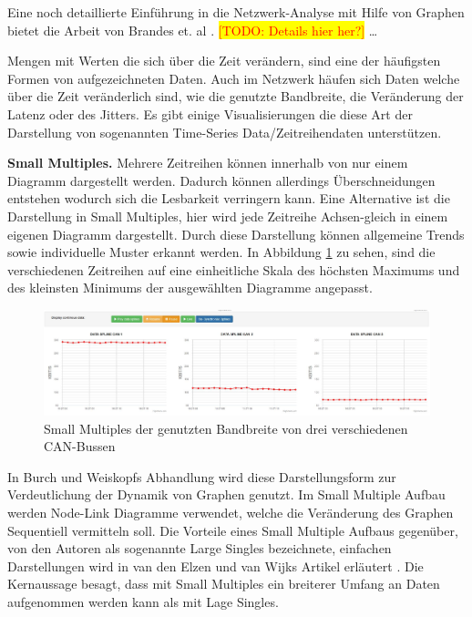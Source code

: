 \documentclass[draft=false
              ,paper=a4
              ,twoside=false
              ,fontsize=11pt
              ,headsepline
              ,BCOR10mm
              ,DIV11
              ]{scrbook}
\newcommand{\TODO}[1]{\colorbox{yellow}{\textcolor{red}{[TODO: #1]}}}
\begin{document}
Eine noch detaillierte Einführung in die Netzwerk-Analyse mit Hilfe von Graphen bietet die Arbeit von Brandes et. al \cite{brandes2005network}. \TODO{Details hier her?}
\ldots

Mengen mit Werten die sich über die Zeit verändern, sind eine der häufigsten Formen von aufgezeichneten Daten. Auch im Netzwerk häufen sich Daten welche über die Zeit veränderlich sind, wie die genutzte Bandbreite, die Veränderung der Latenz oder des Jitters. Es gibt einige Visualisierungen die diese Art der Darstellung von sogenannten Time-Series Data/Zeitreihendaten unterstützen. 

\textbf{Small Multiples.} Mehrere Zeitreihen können innerhalb von nur einem Diagramm dargestellt werden. Dadurch können allerdings Überschneidungen entstehen wodurch sich die Lesbarkeit verringern kann. Eine Alternative ist die Darstellung in Small Multiples, hier wird jede Zeitreihe Achsen-gleich in einem eigenen Diagramm dargestellt. Durch diese Darstellung können allgemeine Trends sowie individuelle Muster erkannt werden. In Abbildung \ref{fig:synch_splines} zu sehen, sind die verschiedenen Zeitreihen auf eine einheitliche Skala des höchsten Maximums und des kleinsten Minimums der ausgewählten Diagramme angepasst.
\begin{figure}[htbp]
  \centering
  \includegraphics[width=\textwidth]{img/synch_splines}
  \caption{Small Multiples der genutzten Bandbreite von drei verschiedenen CAN-Bussen}
  \label{fig:synch_splines}
\end{figure}

In Burch und Weiskopfs Abhandlung \cite{Burch:2014:FES:2636240.2636839} wird diese Darstellungsform zur Verdeutlichung der Dynamik von Graphen genutzt. Im Small Multiple Aufbau werden Node-Link Diagramme verwendet, welche die Veränderung des Graphen Sequentiell vermitteln soll. Die Vorteile eines Small Multiple Aufbaus gegenüber, von den Autoren als sogenannte Large Singles bezeichnete, einfachen Darstellungen wird in van den Elzen und van Wijks Artikel erläutert \cite{elzen_small_multiple_2013}. Die Kernaussage besagt, dass mit Small Multiples ein breiterer Umfang an Daten aufgenommen werden kann als mit Lage Singles.
\end{document}
